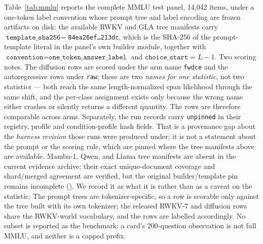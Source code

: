 Table~\ref{tab:mmlu} reports the complete MMLU test panel, 14{,}042 items, under a one-token label convention whose prompt tree and label encoding are frozen artifacts on disk: the available RWKV and GLA tree manifests carry $\texttt{template\_sha256}=$\texttt{84ea26ef\ldots 213dc}, which is the SHA-256 of the prompt-template literal in the panel's own builder module, together with $\texttt{convention}=\texttt{one\_token\_answer\_label}$ and $\texttt{choice\_start}=L-1$. Two scoring notes. The diffusion rows are scored under the arm name \texttt{fwdce} and the autoregressive rows under \texttt{raw}; these are two \emph{names for one statistic}, not two statistics --- both reach the same length-normalized span likelihood through the same shift, and the per-class assignment exists only because the wrong name either crashes or silently returns a different quantity. The rows are therefore comparable across arms. Separately, the run records carry \texttt{unpinned} in their registry, profile and condition-profile hash fields. That is a provenance gap about the \emph{harness revision} those runs were produced under; it is not a statement about the prompt or the scoring rule, which are pinned where the tree manifests above are available. Mamba-1, Qwen, and Llama tree manifests are absent in the current evidence archive: their exact unique-document coverage and shard/merged agreement are verified, but the original builder/template pin remains incomplete (). We record it as what it is rather than as a caveat on the statistic. The prompt trees are tokenizer-specific, so a row is scorable
only against the tree built with its own tokenizer; the released RWKV-7 and diffusion rows
share the RWKV-world vocabulary, and the rows are labelled accordingly. No subset is
reported as the benchmark: a card's 200-question observation is not full MMLU, and neither
is a capped prefix.

